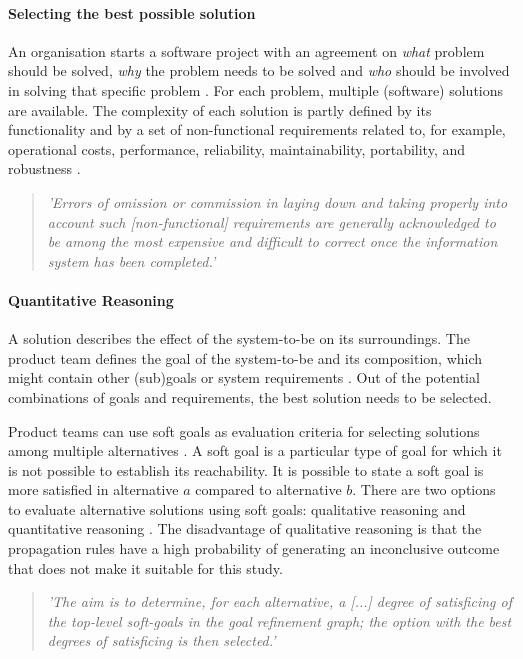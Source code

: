 \paragraph{Selecting the best possible solution} 
An organisation starts a software project with an agreement on \emph{what} problem should be solved, \emph{why} the problem needs to be solved and \emph{who} should be involved in solving that specific problem \parencite{SO03}. For each problem, multiple (software) solutions are available. The complexity of each solution is partly defined by its functionality and by a set of non-functional requirements related to, for example, operational costs, performance, reliability, maintainability, portability, and robustness \parencite{SO06}. 

\begin{quote}\itshape
'Errors of omission or commission in laying down and taking properly into account such [non-functional] requirements are generally acknowledged to be among the most expensive and difficult to correct once the information system has been completed.' \parencite{SO06}
\end{quote}

\paragraph{Quantitative Reasoning} 
A solution describes the effect of the system-to-be on its surroundings. The product team defines the goal of the system-to-be and its composition, which might contain other (sub)goals or system requirements \parencite{SO03}. Out of the potential combinations of goals and requirements, the best solution needs to be selected. 

Product teams can use soft goals as evaluation criteria for selecting solutions among multiple alternatives \parencite{BK04}. A soft goal is a particular type of goal for which it is not possible to establish its reachability. It is possible to state a soft goal is more satisfied in alternative $a$ compared to alternative $b$. There are two options to evaluate alternative solutions using soft goals: qualitative reasoning and quantitative reasoning \parencite{BK04}. The disadvantage of qualitative reasoning is that the propagation rules have a high probability of generating an inconclusive outcome that does not make it suitable for this study. 

\begin{quote}\itshape
'The aim is to determine, for each alternative, a [...] degree of satisficing of the top-level soft-goals in the goal refinement graph; the option with the best degrees of satisficing is then selected.' \parencite{BK04}
\end{quote}

